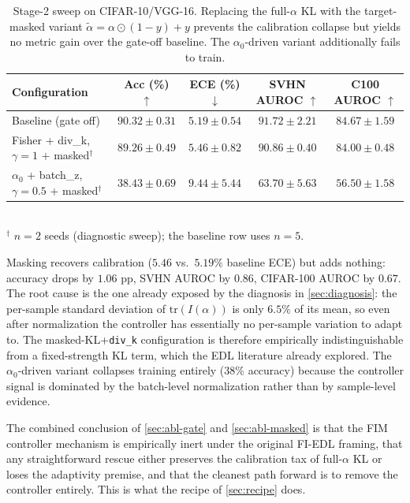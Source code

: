 \documentclass[review,5p,times]{elsarticle}
\begin{document}
\begin{table}[t]
  \centering
  \caption{Stage-2 sweep on CIFAR-10/VGG-16. Replacing the full-$\alpha$
    KL with the target-masked variant $\tilde\alpha\!=\!\alpha\odot(1-y)+y$
    prevents the calibration collapse but yields no metric gain over the
    gate-off baseline. The $\alpha_0$-driven variant additionally fails
    to train.}
  \label{tab:abl-masked}
  \small
  \begin{tabular}{lcccc}
    \toprule
    Configuration & Acc (\%) $\uparrow$ & ECE (\%) $\downarrow$
      & SVHN AUROC $\uparrow$ & C100 AUROC $\uparrow$ \\
    \midrule
    Baseline (gate off)
      & $\mathbf{90.32\!\pm\!0.31}$ & $\mathbf{5.19\!\pm\!0.54}$
      & $\mathbf{91.72\!\pm\!2.21}$ & $\mathbf{84.67\!\pm\!1.59}$ \\
    Fisher + div\_k, $\gamma\!=\!1$ + masked$^{\dagger}$
      & $89.26\!\pm\!0.49$ & $5.46\!\pm\!0.82$
      & $90.86\!\pm\!0.40$ & $84.00\!\pm\!0.48$ \\
    $\alpha_0$ + batch\_z, $\gamma\!=\!0.5$ + masked$^{\dagger}$
      & $38.43\!\pm\!0.69$ & $9.44\!\pm\!5.44$
      & $63.70\!\pm\!5.63$ & $56.50\!\pm\!1.58$ \\
    \bottomrule
  \end{tabular}
  \\ {\footnotesize $^{\dagger}$ $n\!=\!2$ seeds (diagnostic sweep); the
   baseline row uses $n\!=\!5$.}
\end{table}

Masking recovers calibration ($5.46$ vs.\ $5.19\%$ baseline ECE) but
adds nothing: accuracy drops by $1.06$ pp, SVHN AUROC by $0.86$, CIFAR-100
AUROC by $0.67$. The root cause is the one already exposed by the
diagnosis in \autoref{sec:diagnosis}: the per-sample standard deviation of
$\mathrm{tr}(I(\alpha))$ is only $6.5\%$ of its mean, so even after
normalization the controller has essentially no per-sample variation to
adapt to. The masked-KL+\texttt{div\_k} configuration is therefore
empirically indistinguishable from a fixed-strength KL term, which the
EDL literature already explored. The $\alpha_0$-driven variant collapses
training entirely (38\% accuracy) because the controller signal is dominated
by the batch-level normalization rather than by sample-level evidence.

The combined conclusion of \autoref{sec:abl-gate} and \autoref{sec:abl-masked}
is that the FIM controller mechanism is empirically inert under the
original FI-EDL framing, that any straightforward rescue either preserves
the calibration tax of full-$\alpha$ KL or loses the adaptivity premise,
and that the cleanest path forward is to remove the controller entirely.
This is what the recipe of \autoref{sec:recipe} does.
\end{document}
